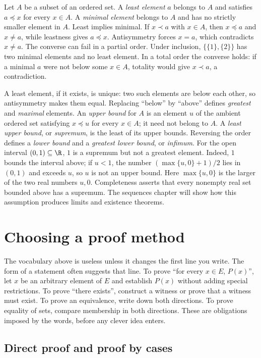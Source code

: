 Let $A$ be a subset of an ordered set. A \emph{least element} $a$ belongs to $A$
and satisfies $a\preceq x$ for every $x\in A$. A \emph{minimal element} belongs
to $A$ and has no strictly smaller element in $A$. Least implies minimal.
If $x\prec a$ with $x\in A$, then $x\preceq a$ and $x\ne a$, while leastness gives
$a\preceq x$. Antisymmetry forces $x=a$, which contradicts $x\ne a$. The converse
can fail in a partial order. Under inclusion, $\{\{1\},\{2\}\}$ has two minimal
elements and no least element. In a total order the converse holds: if a minimal
$a$ were not below some $x\in A$, totality would give $x\prec a$, a contradiction.

A least element, if it exists, is unique: two such elements are below each other,
so antisymmetry makes them equal.
Replacing ``below'' by ``above'' defines \emph{greatest} and \emph{maximal} elements.
An \emph{upper bound} for $A$ is an element $u$ of the ambient ordered set satisfying
$x\preceq u$ for every $x\in A$; it need not belong to $A$. A \emph{least upper
bound}, or \emph{supremum}, is the least of its upper bounds. Reversing the order
defines a \emph{lower bound} and a \emph{greatest lower bound}, or \emph{infimum}.
For the open interval $(0,1)\subseteq\R$, $1$ is a supremum but not a greatest element.
Indeed, $1$ bounds the interval above; if $u<1$, the number
$(\max\{u,0\}+1)/2$ lies in $(0,1)$ and exceeds $u$, so $u$ is not an upper bound.
Here $\max\{u,0\}$ is the larger of the two real numbers $u,0$.
Completeness asserts that every
nonempty real set bounded above has a supremum. The sequences chapter will show
how this assumption produces limits and existence theorems.

\section{Choosing a proof method}

The vocabulary above is useless unless it changes the first line you write.
The form of a statement often suggests that line. To prove
``for every $x\in E$, $P(x)$'', let $x$ be an arbitrary element of $E$ and
establish $P(x)$ without adding special restrictions. To prove ``there exists'',
construct a witness or prove that a witness must exist. To prove an equivalence,
write down both directions. To prove equality of sets, compare membership in
both directions. These are obligations imposed by the words, before any clever idea enters.

\subsection*{Direct proof and proof by cases}

